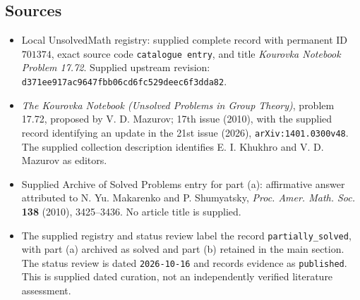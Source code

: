 \documentclass[11pt]{article}
\begin{document}
\subsection{Sources}
\begin{itemize}
\item Local UnsolvedMath registry: supplied complete record with permanent ID \(701374\), exact source code \texttt{catalogue entry}, and title \emph{Kourovka Notebook Problem 17.72}. Supplied upstream revision: \texttt{d371ee917ac9647fbb06cd6fc529deec6f3dda82}.
\item \emph{The Kourovka Notebook (Unsolved Problems in Group Theory)}, problem 17.72, proposed by V. D. Mazurov; 17th issue (2010), with the supplied record identifying an update in the 21st issue (2026), \texttt{arXiv:1401.0300v48}. The supplied collection description identifies E. I. Khukhro and V. D. Mazurov as editors.
\item Supplied Archive of Solved Problems entry for part (a): affirmative answer attributed to N. Yu. Makarenko and P. Shumyatsky, \emph{Proc. Amer. Math. Soc.} \textbf{138} (2010), 3425--3436. No article title is supplied.
\item The supplied registry and status review label the record \texttt{partially\_solved}, with part (a) archived as solved and part (b) retained in the main section. The status review is dated \texttt{2026-10-16} and records evidence as \texttt{published}. This is supplied dated curation, not an independently verified literature assessment.
\end{itemize}
\end{document}
